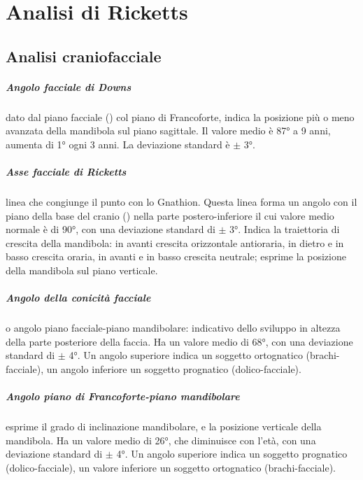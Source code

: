 \chapter{Analisi di Ricketts}

\section{Analisi craniofacciale}

\paragraph{Angolo facciale di Downs} dato dal piano facciale () col piano di Francoforte, indica la posizione più o meno avanzata della mandibola sul piano sagittale. Il valore medio è 87° a 9 anni, aumenta di 1° ogni 3 anni. La deviazione standard è $\pm$ 3°.

\paragraph{Asse facciale di Ricketts} linea che congiunge il punto  con lo Gnathion. Questa linea forma un angolo con il piano della base del cranio () nella parte postero-inferiore il cui valore medio normale è di 90°, con una deviazione standard di $\pm$ 3°. Indica la traiettoria di crescita della mandibola: in avanti crescita orizzontale antioraria, in dietro e in basso crescita oraria, in avanti e in basso crescita neutrale; esprime la posizione della mandibola sul piano verticale.

\paragraph{Angolo della conicità facciale} o angolo piano facciale-piano mandibolare: indicativo dello sviluppo in altezza della parte posteriore della faccia. Ha un valore medio di 68°, con una deviazione standard di $\pm$ 4°. Un angolo superiore indica un soggetto ortognatico (brachi-facciale), un angolo inferiore un soggetto prognatico (dolico-facciale).

\paragraph{Angolo piano di Francoforte-piano mandibolare} esprime il grado di inclinazione mandibolare, e la posizione verticale della mandibola. Ha un valore medio di 26°, che diminuisce con l'età, con una deviazione standard di $\pm$ 4°. Un angolo superiore indica un soggetto prognatico (dolico-facciale), un valore inferiore un soggetto ortognatico (brachi-facciale).


